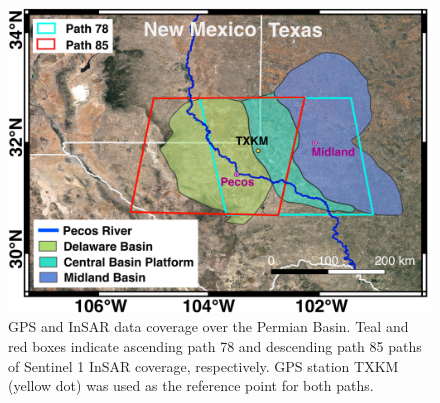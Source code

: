 \documentclass{utexasthesis}
\begin{document}
\begin{figure}[hbt!]
\centering
\includegraphics[width=0.96\linewidth]{paper2/figures/figure4-study-area.png}
\caption{GPS and InSAR data coverage over the Permian Basin. Teal and red boxes indicate ascending path 78 and descending path 85 paths of Sentinel 1 InSAR coverage, respectively. GPS station TXKM (yellow dot) was used as the reference point for both paths.
}
\label{fig:study-area}
\end{figure}
\end{document}
